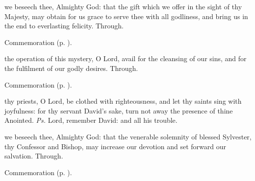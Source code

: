 
\secret
{} we beseech thee, Almighty God: that the gift which we offer in the sight of thy Majesty, may obtain for us grace to serve thee with all godliness, and bring us in the end to everlasting felicity. Through.

\begin{rubric}
    Commemoration  (p. \pageref{NativityMassIIISecret}).
\end{rubric}


\postcommunion
{} the operation of this mystery, O Lord, avail for the cleansing of our sins, and for the fulfilment of our godly desires. Through.


\begin{rubric}
    Commemoration  (p. \pageref{NativityMassIIIPostcommunion}).
\end{rubric}


\label{Sylvester}

\introit
{} thy priests, O Lord, be clothed with righteousness, and let thy saints sing with joyfulness: for thy servant David's sake, turn not away the presence of thine Anointed. \textit{Ps.} Lord, remember David: and all his trouble.

\collect
{} we beseech thee, Almighty God: that the venerable solemnity of blessed Sylvester, thy Confessor and Bishop, may increase our devotion and set forward our salvation. Through.


\begin{rubric}
    Commemoration  (p. \pageref{NativityMassIIIPostcommunion}).
\end{rubric}

